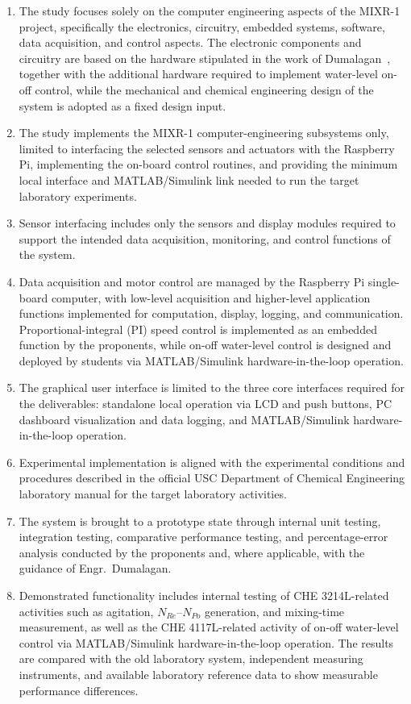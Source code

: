 \begin{enumerate}
    \item The study focuses solely on the computer engineering aspects of the MIXR-1 project, specifically the electronics, circuitry, embedded systems, software, data acquisition, and control aspects. The electronic components and circuitry are based on the hardware stipulated in the work of Dumalagan~\citep{dumalagan2024}, together with the additional hardware required to implement water-level on-off control, while the mechanical and chemical engineering design of the system is adopted as a fixed design input.
    \item The study implements the MIXR-1 computer-engineering subsystems only, limited to interfacing the selected sensors and actuators with the Raspberry Pi, implementing the on-board control routines, and providing the minimum local interface and MATLAB/Simulink link needed to run the target laboratory experiments.
    \item Sensor interfacing includes only the sensors and display modules required to support the intended data acquisition, monitoring, and control functions of the system.
    \item Data acquisition and motor control are managed by the Raspberry Pi single-board computer, with low-level acquisition and higher-level application functions implemented for computation, display, logging, and communication. Proportional-integral (PI) speed control is implemented as an embedded function by the proponents, while on-off water-level control is designed and deployed by students via MATLAB/Simulink hardware-in-the-loop operation.
    \item The graphical user interface is limited to the three core interfaces required for the deliverables: standalone local operation via LCD and push buttons, PC dashboard visualization and data logging, and MATLAB/Simulink hardware-in-the-loop operation.
    \item Experimental implementation is aligned with the experimental conditions and procedures described in the official USC Department of Chemical Engineering laboratory manual for the target laboratory activities.
    \item The system is brought to a prototype state through internal unit testing, integration testing, comparative performance testing, and percentage-error analysis conducted by the proponents and, where applicable, with the guidance of Engr.\ Dumalagan.
    \item Demonstrated functionality includes internal testing of CHE 3214L-related activities such as agitation, $N_{Re}$--$N_{Po}$ generation, and mixing-time measurement, as well as the CHE 4117L-related activity of on-off water-level control via MATLAB/Simulink hardware-in-the-loop operation. The results are compared with the old laboratory system, independent measuring instruments, and available laboratory reference data to show measurable performance differences.

\end{enumerate}

